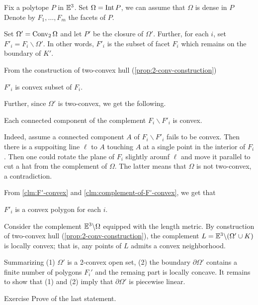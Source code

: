 Fix a polytope $P$ in $\mathbb{E}^3$.
Set $\Omega=\mathop{\rm Int}\nolimits P$, we can assume that $\Omega$ is dense in $P$
Denote by $F_1,\dots,F_m$ the facets of $P$.

Set $\Omega'=\mathop{\rm Conv}\nolimits_2\Omega$ and let $P'$ be the closure of $\Omega'$.
Further, 
for each $i$, 
set $F'_i=F_i\backslash \Omega'$.
In other words, 
$F'_i$ is the subset of facet $F_i$ 
which remains on the boundary of $K'$.

From the construction of two-convex hull (\ref{prop:2-conv-construction})

\begin{clm}{}\label{clm:F'-convex}
$F'_i$ is convex subset of $F_i$.
\end{clm}

Further, since $\Omega'$ is two-convex,
we get the following.

\begin{clm}{}\label{clm:complement-of-F'-convex}
Each connected component of the complement $F_i\backslash F'_i$ is convex.
\end{clm}

Indeed, assume a connected component $A$ of $F_i\backslash F'_i$ fails to be convex.
Then there is a suppoiting line $\ell$ to $A$ touching $A$ at a single point in the interior of $F_i$.
Then one could rotate the plane of $F_i$ slightly arounf $\ell$ and move it parallel to cut a hat from the complement of $\Omega$.
The latter means that $\Omega$ is not two-convex, 
a contradiction.
\claimqeds

From \ref{clm:F'-convex} and \ref{clm:complement-of-F'-convex}, we get that 

\begin{clm}{}$F'_i$ is a convex polygon for each $i$.
\end{clm}

Consider the complement 
$\mathbb{E}^3\backslash \Omega$ 
equipped with the length metric.
By construction of two-convex hull (\ref{prop:2-conv-construction}), 
the complement $L=\EE^3\backslash (\Omega'\cup K)$
is locally convex;
that is, any points of $L$ admits a convex neighborhood.

Summarizing (1)
$\Omega'$ is a 2-convex open set,
(2) the boundary $\partial\Omega'$ 
contains a finite number of polygons $F_i'$
and the remaing part is locally concave.
It remains to show that (1) and (2) imply that $\partial\Omega'$
is piecewise linear.

\begin{thm}{Exercise}\label{ex:convex+saddle+broken=>PL}
Prove of the last statement.
\end{thm}
\qeds

